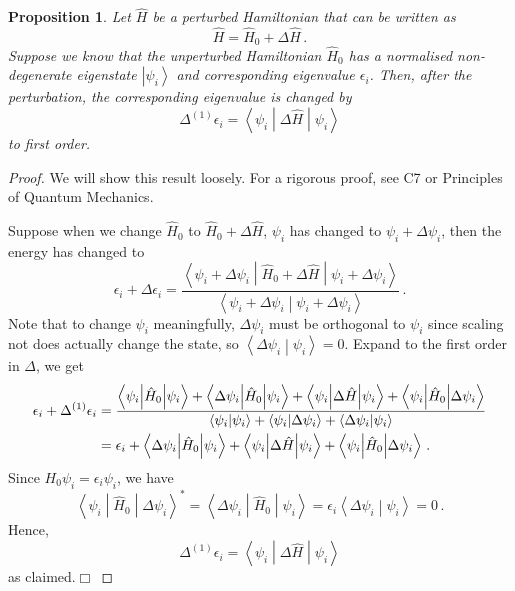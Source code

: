 \documentclass{article}
\theoremstyle{plain}\theoremheaderfont{\normalfont\itshape}\theorembodyfont{\rmfamily}\theoremseparator{.}\newtheorem*{rem}{Remark}\newtheorem*{ex}{Example}\newtheorem*{proof}{Proof}\newtheorem*{altp}{Alternative proof}
\theoremstyle{plain}\theoremheaderfont{\normalfont\bfseries}\theorembodyfont{\rmfamily}\theoremseparator{.}\newtheorem{thm}{Theorem}[section]\newtheorem{lem}[thm]{Lemma}\newtheorem{prop}[thm]{Proposition}\newtheorem*{cor}{Corollary}\newtheorem{defn}[thm]{Definition}\newtheorem{clm}[thm]{Claim}\newtheorem{clminproof}{Claim}\newtheorem{pos}{Postulate}[section]
\theoremstyle{break}\theoremheaderfont{\normalfont\itshape}\theorembodyfont{\rmfamily}\theoremseparator{.\medskip}\newtheorem*{proofskip}{Proof}\newtheorem*{exs}{Examples}\newtheorem*{rems}{Remarks}
\theoremstyle{break}\theoremheaderfont{\normalfont\bfseries}\theorembodyfont{\rmfamily}\theoremseparator{.\medskip}\newtheorem{lemskip}[thm]{Lemma}\newtheorem{defnskip}[thm]{Definition}\newtheorem{propskip}[thm]{Proposition}\newtheorem{thmskip}[thm]{Theorem}
\numberwithin{equation}{section}
\newcommand{\qed}{\hfill\ensuremath{\Box}}
\newcommand{\ket}[1]{\left| #1 \right\rangle}
\newcommand{\braket}[2]{\left\langle #1 \middle| #2 \right\rangle}
\newcommand{\expval}[2]{\left\langle #2 \middle| #1 \middle| #2 \right\rangle}
\newcommand{\mel}[3]{\left\langle #1 \middle| #2 \middle| #3 \right\rangle}
\begin{document}
    \begin{prop}
        Let \(\hat{H}\) be a perturbed Hamiltonian that can be written as
        \begin{equation}
            \hat{H}=\hat{H}_0+\Delta \hat{H}\,.
        \end{equation}
        Suppose we know that the unperturbed Hamiltonian \(\hat{H}_0\) has a normalised non-degenerate eigenstate \(\ket{\psi_i}\) and corresponding eigenvalue \(\epsilon_i\). Then, after the perturbation, the corresponding eigenvalue is changed by
        \begin{equation}
            \Delta^{(1)}\epsilon_i=\expval{\Delta \hat{H}}{\psi_i}
        \end{equation}
        to first order.
    \end{prop}
    \begin{proof}
        We will show this result loosely. For a rigorous proof, see C7 or Principles of Quantum Mechanics.

        Suppose when we change \(\hat{H}_0\) to \(\hat{H}_0+\Delta \hat{H}\), \(\psi_i\) has changed to \(\psi_i+\Delta\psi_i\), then the energy has changed to
        \begin{equation}
            \epsilon_i+\Delta\epsilon_i=\frac{\expval{\hat{H}_0+\Delta \hat{H}}{\psi_i+\Delta\psi_i}}{\braket{\psi_i+\Delta\psi_i}{\psi_i+\Delta\psi_i}}\,.
        \end{equation}
        Note that to change \(\psi_i\) meaningfully, \(\Delta\psi_i\) must be orthogonal to \(\psi_i\) since scaling not does actually change the state, so \(\braket{\Delta\psi_i}{\psi_i}=0\). Expand to the first order in \(\Delta\), we get
        \begin{align}
            \epsilon_i+\Delta^{(1)}\epsilon_i&=\frac{\expval{\hat{H}_0}{\psi_i}+\mel{\Delta\psi_i}{\hat{H}_0}{\psi_i}+\mel{\psi_i}{\Delta \hat{H}}{\psi_i}+\mel{\psi_i}{\hat{H}_0}{\Delta\psi_i}}{\braket{\psi_i}{\psi_i}+\braket{\psi_i}{\Delta\psi_i}+\braket{\Delta\psi_i}{\psi_i}}\notag\\
            &=\epsilon_i+\mel{\Delta\psi_i}{\hat{H}_0}{\psi_i}+\mel{\psi_i}{\Delta \hat{H}}{\psi_i}+\mel{\psi_i}{\hat{H}_0}{\Delta\psi_i}\,.
        \end{align}
        Since \(H_0\psi_i=\epsilon_i\psi_i\), we have
        \begin{equation}
            \mel{\psi_i}{\hat{H}_0}{\Delta\psi_i}^*=\mel{\Delta\psi_i}{\hat{H}_0}{\psi_i}=\epsilon_i\braket{\Delta\psi_i}{\psi_i}=0\,.
        \end{equation}
        Hence,
        \begin{equation}
            \Delta^{(1)}\epsilon_i=\expval{\Delta \hat{H}}{\psi_i}
        \end{equation}
        as claimed.\qed
    \end{proof}
\end{document}
